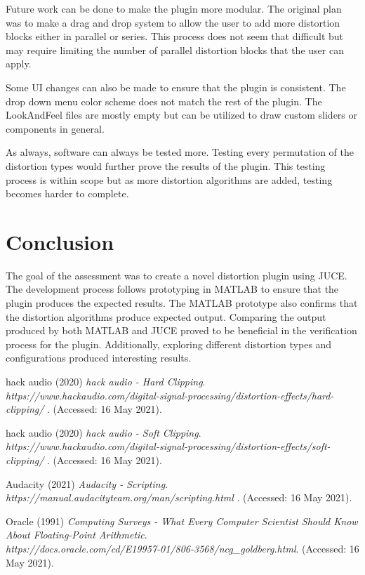 \documentclass{article}
\begin{document}
Future work can be done to make the plugin more modular. The original plan was to make a
drag and drop system to allow the user to add more distortion blocks either in parallel
or series. This process does not seem that difficult but may require limiting the number
of parallel distortion blocks that the user can apply.

Some UI changes can also be made to ensure that the plugin is consistent. The drop down
menu color scheme does not match the rest of the plugin. The LookAndFeel files are mostly
empty but can be utilized to draw custom sliders or components in general.

As always, software can always be tested more. Testing every permutation of the
distortion types would further prove the results of the plugin. This testing process
is within scope but as more distortion algorithms are added, testing becomes harder to complete.

\pagebreak
\section{Conclusion}
The goal of the assessment was to create a novel distortion plugin using JUCE. The
development process follows prototyping in MATLAB to ensure that the plugin produces
the expected results. The MATLAB prototype also confirms that the distortion algorithms
produce expected output. Comparing the output produced by both MATLAB and JUCE proved to
be beneficial in the verification process for the plugin. Additionally, exploring different
distortion types and configurations produced interesting results.

\pagebreak
{}
\begin{thebibliography}{9}
hack audio (2020)
\textit{hack audio - Hard Clipping}. \\\textit{https://www.hackaudio.com/digital-signal-processing/distortion-effects/hard-clipping/
}. (Accessed: 16 May 2021).

hack audio (2020)
\textit{hack audio - Soft Clipping}. \\\textit{https://www.hackaudio.com/digital-signal-processing/distortion-effects/soft-clipping/
}. (Accessed: 16 May 2021).

Audacity (2021)
\textit{Audacity - Scripting}. \\\textit{https://manual.audacityteam.org/man/scripting.html
}. (Accessed: 16 May 2021).

Oracle (1991)
\textit{Computing Surveys - What Every Computer Scientist Should Know About Floating-Point Arithmetic}. \\\textit{https://docs.oracle.com/cd/E19957-01/806-3568/ncg\_goldberg.html}. (Accessed: 16 May 2021).

\end{thebibliography}
\end{document}
